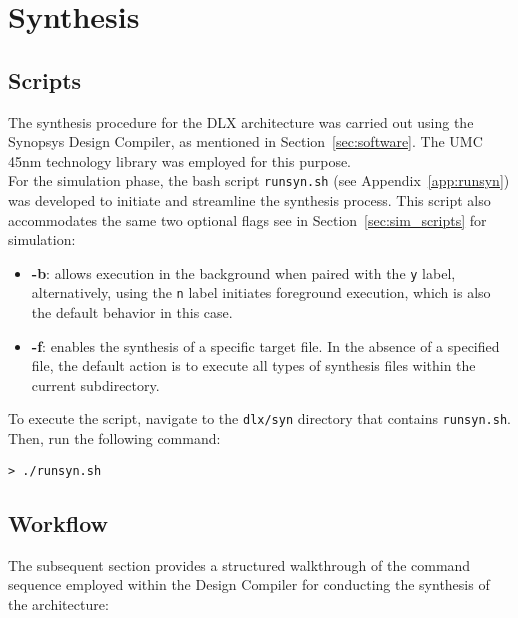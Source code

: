 \chapter{Synthesis}
\label{chap:06_synthesis}

\section{Scripts}
\label{sec:syn_scripts}

The synthesis procedure for the DLX architecture was carried out using the Synopsys Design Compiler, as mentioned in Section~\ref{sec:software}. The UMC 45nm technology library was employed for this purpose. \\

For the simulation phase, the bash script \texttt{runsyn.sh} (see Appendix~\ref{app:runsyn}) was developed to initiate and streamline the synthesis process. This script also accommodates the same two optional flags see in Section~\ref{sec:sim_scripts} for simulation:

\begin{itemize}
    \item \textbf{-b}: allows execution in the background when paired with the \texttt{y} label, alternatively, using the \texttt{n} label initiates foreground execution, which is also the default behavior in this case.
    \item \textbf{-f}: enables the synthesis of a specific target file. In the absence of a specified file, the default action is to execute all types of synthesis files within the current subdirectory.
\end{itemize}

To execute the script, navigate to the \texttt{dlx/syn} directory that contains \texttt{runsyn.sh}. Then, run the following command:
\begin{lstlisting}[style=MyShell]
 > ./runsyn.sh
\end{lstlisting}

\section{Workflow}

The subsequent section provides a structured walkthrough of the command sequence employed within the Design Compiler for conducting the synthesis of the architecture:

